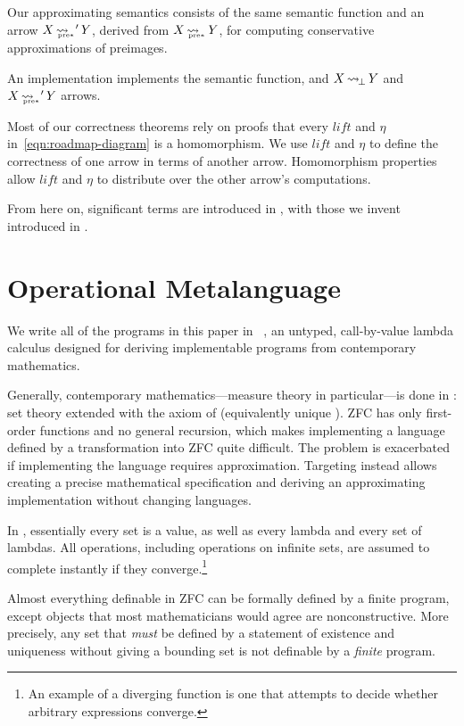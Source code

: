 \documentclass[preprint]{sigplanconf}
\newcommand{\arrow}{\rightsquigarrow}
\newcommand{\arrowlift}{\ensuremath{lift}}
\newcommand{\arrowtrans}{\ensuremath{\eta}}
\DeclareMathOperator{\botto}{\arrow_{\mspace{-3mu}\bot}}
\DeclareMathOperator{\ppreto}{\arrow_{\mspace{-19mu}_{\mathrm{pre*}}}}
\begin{document}
Our approximating semantics consists of the same semantic function and an arrow $X \ppreto' Y$, derived from $X \ppreto Y$, for computing conservative approximations of preimages.

An implementation implements the semantic function, and $X \botto Y$ and $X \ppreto' Y$ arrows.

Most of our correctness theorems rely on proofs that every $\arrowlift$ and $\arrowtrans$ in~\eqref{eqn:roadmap-diagram} is a homomorphism.
We use $\arrowlift$ and $\arrowtrans$ to define the correctness of one arrow in terms of another arrow.
Homomorphism properties allow $\arrowlift$ and $\arrowtrans$ to distribute over the other arrow's computations.

From here on, significant terms are introduced in , with those we invent introduced in .


\section{Operational Metalanguage}

We write all of the programs in this paper in \lzfclang~\cite{cit:toronto-2012flops-lzfc}, an untyped, call-by-value lambda calculus designed for deriving implementable programs from contemporary mathematics.

Generally, contemporary mathematics---measure theory in particular---is done in :  set theory extended with the axiom of  (equivalently unique ).
ZFC has only first-order functions and no general recursion, which makes implementing a language defined by a transformation into ZFC quite difficult.
The problem is exacerbated if implementing the language requires approximation.
Targeting \lzfclang instead allows creating a precise mathematical specification and deriving an approximating implementation without changing languages.

In \lzfclang, essentially every set is a value, as well as every lambda and every set of lambdas.
All operations, including operations on infinite sets, are assumed to complete instantly if they converge.\footnote{An example of a diverging \lzfclang function is one that attempts to decide whether arbitrary \lzfclang expressions converge.}

Almost everything definable in ZFC can be formally defined by a finite \lzfclang program, except objects that most mathematicians would agree are nonconstructive.
More precisely, any set that \emph{must} be defined by a statement of existence and uniqueness without giving a bounding set is not definable by a \emph{finite} \lzfclang program.
\end{document}
